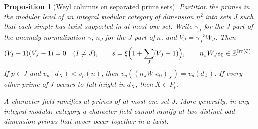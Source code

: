 \documentclass[11pt,a4paper]{article}
\numberwithin{equation}{section}
\newtheorem{proposition}[theorem]{Proposition}
\theoremstyle{remark}
\newcommand{\C}{\mathcal C}
\newcommand{\Irr}{\operatorname{Irr}}
\begin{document}
\begin{proposition}[Weyl columns on separated prime sets]\label{deep:cluster}
Partition the primes in the modular level of an integral modular category
of dimension $n^2$ into sets $J$ such that each simple has twist
supported in at most one set. Write $\gamma_J$ for the $J$-part
of the anomaly normalization $\gamma$, $n_J$ for the $J$-part of
$n$, and $V_J=\gamma_J^{-3}W_J$. Then
\begin{equation}\label{eq:weylsplit}
   (V_I-1)(V_J-1)=0\quad(I\ne J),\qquad
   s=\xi\Bigl(1+\sum_J(V_J-1)\Bigr),\qquad
   n_J W_J e_0\in\mathbb Z^{\Irr(\C)} .
\end{equation}
If $p\in J$ and $v_p(d_X)<v_p(n)$, then
$v_p((n_J W_Je_0)_X)=v_p(d_X)$. If every other prime of $J$
occurs to full height in $d_X$, then $X\in P_p$.

A character field ramifies at primes of at most one set $J$. More
generally, in any integral modular category a character field cannot
ramify at two distinct odd dimension primes that never occur together
in a twist.
\end{proposition}
\end{document}
